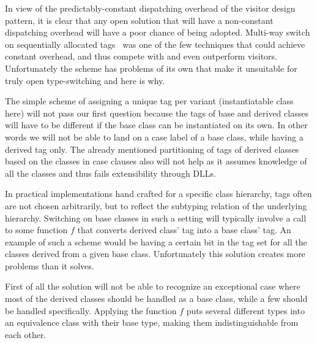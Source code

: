 \documentclass[preprint]{sigplanconf}
\begin{document}
In view of the predictably-constant dispatching overhead of the visitor design pattern, 
it is clear that any open solution that will have a non-constant dispatching 
overhead will have a poor chance of being adopted. Multi-way switch on 
sequentially allocated tags~\cite{Spuler94} was one of the few techniques that 
could achieve constant overhead, and thus compete with and even outperform visitors. 
Unfortunately the scheme has problems of its own that make it unsuitable for 
truly open type-switching and here is why.



The simple scheme of assigning a unique tag per variant (instantiatable class 
here) will not pass our first question because the tags of base and derived 
classes will have to be different if the base class can be instantiated on its 
own. In other words we will not be able to land on a case label of a base class, while 
having a derived tag only. The already mentioned partitioning of tags of derived 
classes based on the classes in case clauses also will not help as it assumes 
knowledge of all the classes and thus fails extensibility through DLLs.

In practical implementations hand crafted for a specific class hierarchy, tags 
often are not chosen arbitrarily, but to reflect the subtyping relation of the 
underlying hierarchy. Switching on base classes in such a setting will typically 
involve a call to some function $f$ that converts derived class' tag into a base 
class' tag. An example of such a scheme would be having a certain bit in the tag 
set for all the classes derived from a given base class. Unfortunately this 
solution creates more problems than it solves.

First of all the solution will not be able to recognize an exceptional case 
where most of the derived classes should be handled as a base class, while a few 
should be handled specifically. Applying the function $f$ puts several different 
types into an equivalence class with their base type, making them 
indistinguishable from each other.
\end{document}
